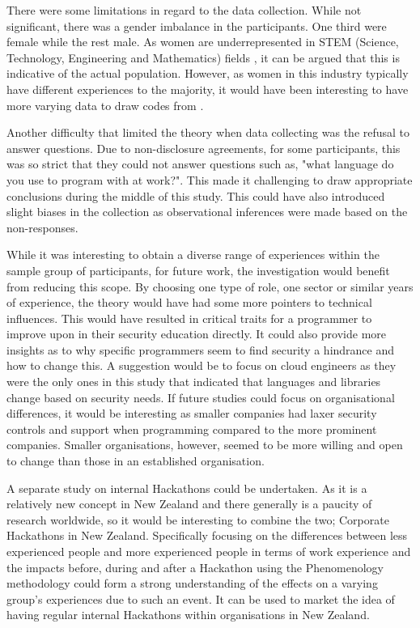 \par There were some limitations in regard to the data collection. While not significant, there was a gender imbalance in the participants. One third were female while the rest male. As women are underrepresented in STEM (Science, Technology, Engineering and Mathematics) fields \cite{wit}, it can be argued that this is indicative of the actual population. However, as women in this industry typically have different experiences to the majority, it would have been interesting to have more varying data to draw codes from \cite{wit}. 
\newline
\par
Another difficulty that limited the theory when data collecting was the refusal to answer questions. Due to non-disclosure agreements, for some participants, this was so strict that they could not answer questions such as, "what language do you use to program with at work?". This made it challenging to draw appropriate conclusions during the middle of this study. This could have also introduced slight biases in the collection as observational inferences were made based on the non-responses. 
\newline
\par
While it was interesting to obtain a diverse range of experiences within the sample group of participants, for future work, the investigation would benefit from reducing this scope. By choosing one type of role, one sector or similar years of experience, the theory would have had some more pointers to technical influences. This would have resulted in critical traits for a programmer to improve upon in their security education directly. It could also provide more insights as to why specific programmers seem to find security a hindrance and how to change this. A suggestion would be to focus on cloud engineers as they were the only ones in this study that indicated that languages and libraries change based on security needs. If future studies could focus on organisational differences, it would be interesting as smaller companies had laxer security controls and support when programming compared to the more prominent companies. Smaller organisations, however, seemed to be more willing and open to change than those in an established organisation.
\newline
\par 
A separate study on internal Hackathons could be undertaken. As it is a relatively new concept in New Zealand and there generally is a paucity of research worldwide, so it would be interesting to combine the two; Corporate Hackathons in New Zealand. Specifically focusing on the differences between less experienced people and more experienced people in terms of work experience and the impacts before, during and after a Hackathon using the Phenomenology methodology could form a strong understanding of the effects on a varying group's experiences due to such an event. It can be used to market the idea of having regular internal Hackathons within organisations in New Zealand. 


